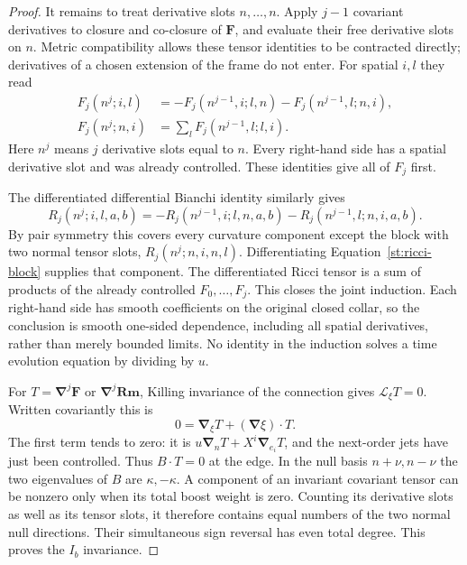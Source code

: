 \begin{proof}
It remains to treat derivative slots $n,\ldots,n$.  Apply $j-1$
covariant derivatives to closure and co-closure of $\mathbf F$, and
evaluate their free derivative slots on $n$.  Metric compatibility
allows these tensor identities to be contracted directly; derivatives
of a chosen extension of the frame do not enter.  For spatial $i,l$
they read
\begin{align}
 F_j(n^j;i,l)
 &=-F_j(n^{j-1},i;l,n)-F_j(n^{j-1},l;n,i),\label{st:maxwell-curl-jets}\\
 F_j(n^j;n,i)
 &=\sum_lF_j(n^{j-1},l;l,i).\label{st:maxwell-div-jets}
\end{align}
Here $n^j$ means $j$ derivative slots equal to $n$.  Every right-hand
side has a spatial derivative slot and was already controlled.  These
identities give all of $F_j$ first.

The differentiated differential Bianchi identity similarly gives
\begin{equation}\label{st:bianchi-jets}
 R_j(n^j;i,l,a,b)
 =-R_j(n^{j-1},i;l,n,a,b)
  -R_j(n^{j-1},l;n,i,a,b).
\end{equation}
By pair symmetry this covers every curvature component except the
block with two normal tensor slots, $R_j(n^j;n,i,n,l)$.
Differentiating
Equation~\eqref{st:ricci-block} supplies that component.  The
differentiated Ricci tensor is a sum of products of the already
controlled $F_0,\ldots,F_j$.  This closes the joint induction.  Each
right-hand side has smooth coefficients on the original closed
collar, so the conclusion is smooth one-sided dependence, including
all spatial derivatives, rather than merely bounded limits.  No
identity in the induction solves a time evolution equation by
dividing by $u$.

For $T=\boldsymbol\nabla^j\mathbf F$ or
$\boldsymbol\nabla^j\mathbf{Rm}$, Killing invariance of the
connection gives $\mathcal L_\xi T=0$.  Written covariantly this is
\[
 0=\boldsymbol\nabla_\xi T+(\boldsymbol\nabla\xi)\cdot T.
\]
The first term tends to zero: it is
$u\boldsymbol\nabla_nT+X^i\boldsymbol\nabla_{e_i}T$, and the
next-order jets have just been controlled.  Thus $B\cdot T=0$ at
the edge.  In the null basis $n+\nu,n-\nu$ the two eigenvalues of
$B$ are $\kappa,-\kappa$.  A component of an invariant covariant
tensor can be nonzero only when its total boost weight is zero.
Counting its derivative slots as well as its tensor slots, it
therefore contains equal numbers of the two normal null directions.
Their simultaneous sign reversal has even total degree.  This proves
the $I_b$ invariance.
\end{proof}

